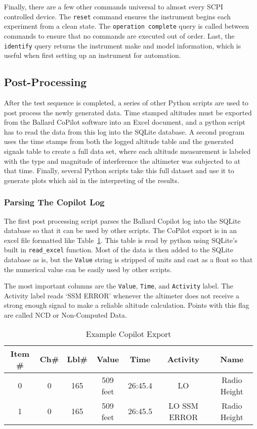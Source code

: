 Finally, there are a few other commands universal to almost every SCPI controlled device. The \texttt{reset} command ensures the instrument begins each experiment from a clean state. The \texttt{operation complete} query is called between commands to ensure that no commands are executed out of order. Last, the \texttt{identify} query returns the instrument make and model information, which is useful when first setting up an instrument for automation. 

\subsection{Post-Processing}
After the test sequence is completed, a series of other Python scripts are used to post process the newly generated data. Time stamped altitudes must be exported from the Ballard CoPilot software into an Excel document, and a python script has to read the data from this log into the SQLite database. A second program uses the time stamps from both the logged altitude table and the generated signals table to create a full data set, where each altitude measurement is labeled with the type and magnitude of interference the altimeter was subjected to at that time. Finally, several Python scripts take this full dataset and use it to generate plots which aid in the interpreting of the results. 

\subsubsection{Parsing The Copilot Log}
The first post processing script parses the Ballard Copilot log into the SQLite database so that it can be used by other scripts. The CoPilot export is in an excel file formatted like Table~\ref{tab:Copilot}. This table is read by python using SQLite's built in \texttt{read\_excel} function. Most of the data is then added to the SQLite database as is, but the \texttt{Value} string is stripped of units and cast as a float so that the numerical value can be easily used by other scripts. 

The most important columns are the \texttt{Value}, \texttt{Time}, and \texttt{Activity} label. The Activity label reads `SSM ERROR'  whenever the altimeter does not receive a strong enough signal to make a reliable altitude calculation. Points with this flag are called NCD or Non-Computed Data. 
\begin{table}[]
\centering
\begin{tabular}{ccccccc}

\hline
Item \# & Ch\# & Lbl\# & Value    & Time    & Activity      & Name         \\ \hline
0       & 0    & 165   & 509 feet & 26:45.4 & LO            & Radio Height \\
1       & 0    & 165   & 509 feet & 26:45.5 & LO SSM ERROR & Radio Height \\ \hline
\end{tabular}
\caption{Example Copilot Export}
\label{tab:Copilot}
\end{table}

